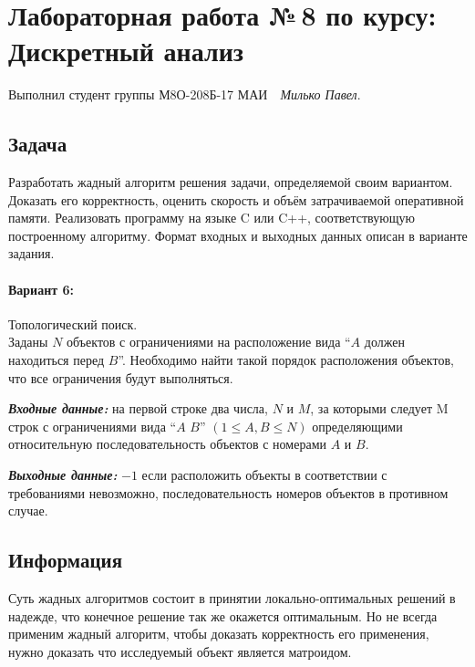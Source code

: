 \documentclass[12pt]{article}
\begin{document}
\section*{\centering Лабораторная работа №\,8 по курсу:\\ Дискретный анализ}

Выполнил студент группы М8О-208Б-17 МАИ \,\, \textit{Милько Павел}.

\subsection*{Задача}

Разработать жадный алгоритм решения задачи, определяемой своим
вариантом. Доказать его корректность, оценить скорость и объём
затрачиваемой оперативной памяти.
Реализовать программу на языке C или C++, соответствующую
построенному алгоритму. Формат входных и выходных данных описан в
варианте задания.


\paragraph*{Вариант 6:} Топологический поиск.\\
Заданы $N$ объектов с ограничениями на расположение вида ``$A$ должен
находиться перед $B$''. Необходимо найти такой порядок расположения
объектов, что все ограничения будут выполняться.

\textit{\textbf{Входные данные:}} на первой строке два числа, $N$ и $M$, за которыми следует M строк с
ограничениями вида ``$A$ $B$'' $(1 \le A, B \le N )$ определяющими
относительную последовательность объектов с номерами $A$ и $B$.

\textit{ \textbf{Выходные данные:}}  $−1$ если расположить объекты в соответствии с
требованиями невозможно, последовательность номеров объектов в
противном случае.

\subsection*{Информация}

Суть жадных алгоритмов состоит в принятии локально-оптимальных решений в надежде, что
конечное решение так же окажется оптимальным. Но не всегда применим жадный алгоритм, чтобы
доказать корректность его применения, нужно доказать что исследуемый объект является
матроидом.
\end{document}
